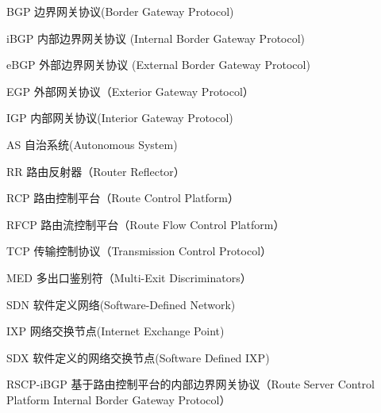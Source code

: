 \begin{denotation}[3cm]
\item[BGP] 边界网关协议(Border Gateway Protocol)
\item[iBGP] 内部边界网关协议 (Internal Border Gateway Protocol)
\item[eBGP] 外部边界网关协议 (External Border Gateway Protocol)
\item[EGP] 外部网关协议（Exterior Gateway Protocol）
\item[IGP] 内部网关协议(Interior Gateway Protocol)
\item[AS] 自治系统(Autonomous System)
\item[RR] 路由反射器（Router Reflector）
\item[RCP] 路由控制平台（Route Control Platform）
\item[RFCP] 路由流控制平台（Route Flow Control Platform）
\item[TCP] 传输控制协议（Transmission Control Protocol）
\item[MED] 多出口鉴别符（Multi-Exit Discriminators）
\item[SDN] 软件定义网络(Software-Defined Network)
\item[IXP] 网络交换节点(Internet Exchange Point)
\item[SDX] 软件定义的网络交换节点(Software Defined IXP)
\item[RSCP-iBGP] 基于路由控制平台的内部边界网关协议（Route Server Control Platform Internal Border Gateway Protocol）
\end{denotation}
